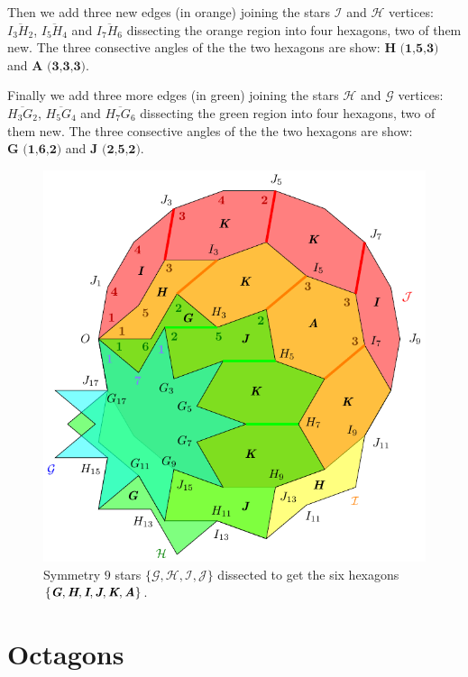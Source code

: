\documentclass[11pt]{article}
\def\mathbi#1{\textbf{\em #1}}
\begin{document}
Then we add three new edges (in orange) joining the stars $\mathcal{I}$ and $\mathcal{H}$ vertices: $\overline{I_3H_2}$, $\overline{I_5H_4}$ and $\overline{I_7H_6}$ dissecting the orange region into four hexagons, two of them new. The three consective angles of the the two hexagons are show: $\textbf{H (1,5,3)}$ and $\textbf{A (3,3,3)}$.

Finally we add three more edges (in green) joining the stars $\mathcal{H}$ and $\mathcal{G}$ vertices:
$\overline{H_3G_2}$, $\overline{H_5G_4}$ and $\overline{H_7G_6}$ dissecting the green region into four hexagons, two of them new. The three consective angles of the the two hexagons are show: $\textbf{G (1,6,2)}$ and $\textbf{J (2,5,2)}$.


\begin{figure}[H]
\centering
\includegraphics[scale=1]{hexagons-9}
\caption{Symmetry $9$ stars $\{\mathcal{G},\mathcal{H},\mathcal{I},\mathcal{J}\}$
 dissected to get the six hexagons
$\{\mathbi{G},\mathbi{H},\mathbi{I},\mathbi{J},\mathbi{K},\mathbi{A}\}$.
}
\label{fig:hexagons-9}
\end{figure}

\section{Octagons}
\end{document}
